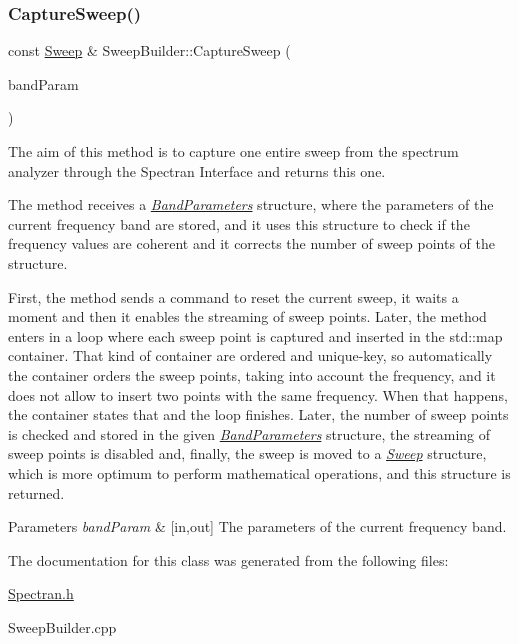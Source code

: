 \subsubsection{\texorpdfstring{Capture\+Sweep()}{CaptureSweep()}}
{\footnotesize\ttfamily const \hyperlink{structSweep}{Sweep} \& Sweep\+Builder\+::\+Capture\+Sweep (\begin{DoxyParamCaption}\item[{\hyperlink{structBandParameters}{Band\+Parameters} \&}]{band\+Param }\end{DoxyParamCaption})}



The aim of this method is to capture one entire sweep from the spectrum analyzer through the Spectran Interface and returns this one. 

The method receives a {\itshape \hyperlink{structBandParameters}{Band\+Parameters}} structure, where the parameters of the current frequency band are stored, and it uses this structure to check if the frequency values are coherent and it corrects the number of sweep points of the structure.

First, the method sends a command to reset the current sweep, it waits a moment and then it enables the streaming of sweep points. Later, the method enters in a loop where each sweep point is captured and inserted in the {\ttfamily std\+::map} container. That kind of container are ordered and unique-\/key, so automatically the container orders the sweep points, taking into account the frequency, and it does not allow to insert two points with the same frequency. When that happens, the container states that and the loop finishes. Later, the number of sweep points is checked and stored in the given {\itshape \hyperlink{structBandParameters}{Band\+Parameters}} structure, the streaming of sweep points is disabled and, finally, the sweep is moved to a {\itshape \hyperlink{structSweep}{Sweep}} structure, which is more optimum to perform mathematical operations, and this structure is returned. 
\begin{DoxyParams}{Parameters}
{\em band\+Param} & \mbox{[}in,out\mbox{]} The parameters of the current frequency band. \\
\hline
\end{DoxyParams}


The documentation for this class was generated from the following files\+:\begin{DoxyCompactItemize}
\item 
\hyperlink{Spectran_8h}{Spectran.\+h}\item 
Sweep\+Builder.\+cpp\end{DoxyCompactItemize}

